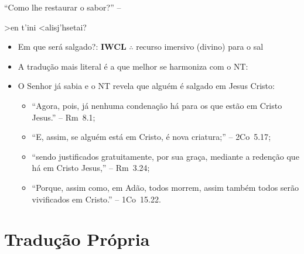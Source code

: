 \documentclass[12pt,aspectratio=169]{beamer}
\newcommand{\RED}[1]{{\textcolor{TXred}{#1}}}
\newcommand{\YEL}[1]{{\textcolor{TXyel}{#1}}}
\newcommand{\GRE}[1]{{\textcolor{TXgre}{#1}}}
\newcommand{\MAG}[1]{{\textcolor{TXmag}{#1}}}
\newcommand{\BRI}[1]{{\textcolor{BSpbg}{#1}}}   %
\newcommand{\GRtxt}[1]{\begin{otherlanguage}{greek}{{#1}}\end{otherlanguage}}
\begin{document}
    \begin{frame}{\BRI{``Como lhe restaurar o sabor?''} -- \GRtxt{>en t'ini <alisj'hsetai?}}
        \begin{itemize}
            \item<1-> \MAG{Em que será salgado?}:
                \BRI{\textbf{IWCL}}
                $\therefore$ recurso imersivo (divino) para o sal
                \\[\medskipamount]
            \item<2-> A tradução \GRE{mais literal} é a que \GRE{melhor se harmoniza} com o NT:
                \\[\medskipamount]
            \item<3-> O Senhor já sabia e o NT revela que alguém é salgado \MAG{em Jesus
                Cristo}:
                \begin{itemize}
                    \item<4-> ``Agora, pois, já nenhuma condenação há para os que \MAG{estão em
                        Cristo Jesus}.'' -- \BRI{Rm~8.1};
                        \\[\smallskipamount]
                    \item<5-> ``E, assim, se alguém \MAG{está em Cristo}, é nova criatura;'' --
                        \BRI{2Co~5.17};
                        \\[\smallskipamount]
                    \item<6-> ``sendo \YEL{justificados} gratuitamente, por sua graça, mediante
                        a \YEL{redenção} que \MAG{há em Cristo Jesus},'' -- \BRI{Rm~3.24};
                        \\[\smallskipamount]
                    \item<7-> ``Porque, assim como, \RED{em Adão, todos morrem}, assim também
                        todos serão \MAG{vivificados em Cristo}.'' -- \BRI{1Co~15.22}.
                \end{itemize}
        \end{itemize}
    \end{frame}

\section{Tradução Própria}
\end{document}
